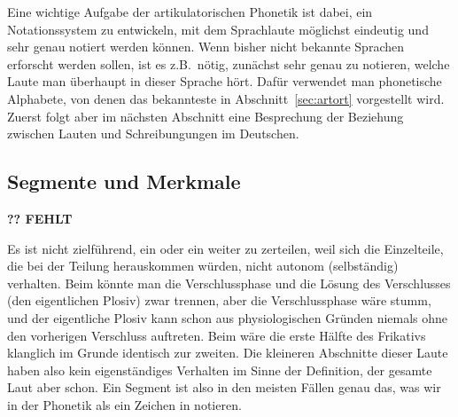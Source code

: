Eine wichtige Aufgabe der artikulatorischen Phonetik ist dabei, ein Notationssystem zu entwickeln, mit dem Sprachlaute möglichst eindeutig und sehr genau notiert werden können.
Wenn bisher nicht bekannte Sprachen erforscht werden sollen, ist es z.B.\ nötig, zunächst sehr genau zu notieren, welche Laute man überhaupt in dieser Sprache hört.
Dafür verwendet man phonetische Alphabete, von denen das bekannteste in Abschnitt~\ref{sec:artort} vorgestellt wird.
Zuerst folgt aber im nächsten Abschnitt eine Besprechung der Beziehung zwischen Lauten und Schreibungungen im Deutschen.


\subsection{Segmente und Merkmale}

\textbf{?? FEHLT}

Es ist \zB nicht zielführend, ein \textipa{[t]} oder ein \textipa{[s]} weiter zu zerteilen, weil sich die Einzelteile, die bei der Teilung herauskommen würden, nicht autonom (selbständig) verhalten.
Beim \textipa{[t]} könnte man die Verschlussphase und die Lösung des Verschlusses (den eigentlichen Plosiv) zwar trennen, aber die Verschlussphase wäre stumm, und der eigentliche Plosiv kann schon aus physiologischen Gründen niemals ohne den vorherigen Verschluss auftreten.
Beim \textipa{[s]} wäre die erste Hälfte des Frikativs klanglich im Grunde identisch zur zweiten.
Die kleineren Abschnitte dieser Laute haben also kein eigenständiges Verhalten im Sinne der Definition, der gesamte Laut aber schon.
Ein Segment ist also in den meisten Fällen genau das, was wir in der Phonetik als ein Zeichen in \textipa{[~]} notieren.

